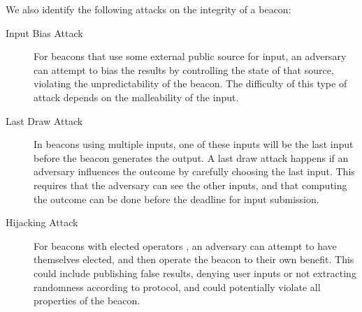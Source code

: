 \noindent%
We also identify the following attacks on the integrity of a beacon:

\begin{description}
    \item[Input Bias Attack] For beacons that use some external public source for input, an adversary can attempt to bias the results by controlling the state of that source, violating the unpredictability of the beacon.
        The difficulty of this type of attack depends on the malleability of the input.
    \item[Last Draw Attack] In beacons using multiple inputs, one of these inputs will be the last input before the beacon generates the output.
        A last draw attack happens if an adversary influences the outcome by carefully choosing the last input.
        This requires that the adversary can see the other inputs, and that computing the outcome can be done before the deadline for input submission.
    \item[Hijacking Attack] For beacons with elected operators , an adversary can attempt to have themselves elected, and then operate the beacon to their own benefit.
        This could include publishing false results, denying user inputs or not extracting randomness according to protocol, and could potentially violate all properties of the beacon. %

\end{description}

